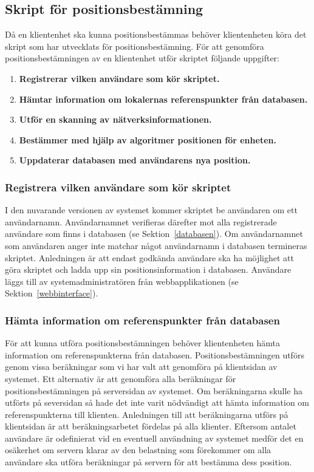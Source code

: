 \documentclass[a4paper,12pt]{article}
\begin{document}
 \subsection{Skript för positionsbestämning}
 Då en klientenhet ska kunna positionsbestämmas behöver klientenheten köra det skript som har utvecklats för positionsbestämning. För att genomföra positionsbestämningen av en klientenhet utför skriptet följande uppgifter:
 \begin{enumerate}
   \item \textbf{Registrerar vilken användare som kör skriptet.}
   \item \textbf{Hämtar information om lokalernas referenspunkter från databasen.}
   \item \textbf{Utför en skanning av nätverksinformationen.}
   \item \textbf{Bestämmer med hjälp av algoritmer positionen för enheten.}
   \item \textbf{Uppdaterar databasen med användarens nya position.}
 \end{enumerate}


 \subsubsection{Registrera vilken användare som kör skriptet}
 I den nuvarande versionen av systemet kommer skriptet be användaren om ett användarnamn. Användarnamnet verifieras därefter mot alla registrerade användare som finns i databasen (se Sektion~\ref{databasen}). Om användarnamnet som användaren anger inte matchar något användarnamn i databasen termineras skriptet. Anledningen är att endast godkända användare ska ha möjlighet att göra skriptet och ladda upp sin positionsinformation i databasen. Användare läggs till av systemadministratören från webbapplikationen (se Sektion~\ref{webbinterface}).

 \subsubsection{Hämta information om referenspunkter från databasen}\label{HamtaInfoDB}
 För att kunna utföra positionsbestämningen behöver klientenheten hämta information om referenspunkterna från databasen. Positionsbestämningen utförs genom vissa beräkningar som vi har valt att genomföra på klientsidan av systemet. Ett alternativ är att genomföra alla beräkningar för positionsbestämningen på serversidan av systemet. Om beräkningarna skulle ha utförts på seversidan så hade det inte varit nödvändigt att hämta information om referenspunkterna till klienten. Anledningen till att beräkningarna utförs på klientsidan är att beräkningsarbetet fördelas på alla klienter. Eftersom antalet användare är odefinierat vid en eventuell användning av systemet medför det en osäkerhet om servern klarar av den belastning som förekommer om alla användare ska utföra beräkningar på servern för att bestämma dess position.
\end{document}
